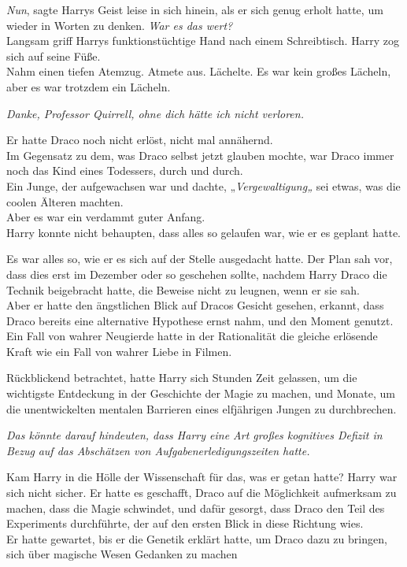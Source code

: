 {\emph{Nun}, sagte Harrys Geist leise in sich hinein, als er sich genug erholt hatte, um wieder in Worten zu denken. \emph{War es das wert?}\\ Langsam griff Harrys funktionstüchtige Hand nach einem Schreibtisch. Harry zog sich auf seine Füße.\\ Nahm einen tiefen Atemzug. Atmete aus. Lächelte. Es war kein großes Lächeln, aber es war trotzdem ein Lächeln.

\emph{Danke, Professor Quirrell, ohne dich hätte ich nicht verloren.}

Er hatte Draco noch nicht erlöst, nicht mal annähernd.\\ Im Gegensatz zu dem, was Draco selbst jetzt glauben mochte, war Draco immer noch das Kind eines Todessers, durch und durch.\\ Ein Junge, der aufgewachsen war und dachte, „\emph{Vergewaltigung„} sei etwas, was die coolen Älteren machten.\\ Aber es war ein verdammt guter Anfang.\\ Harry konnte nicht behaupten, dass alles so gelaufen war, wie er es geplant hatte.

Es war alles so, wie er es sich auf der Stelle ausgedacht hatte. Der Plan sah vor, dass dies erst im Dezember oder so geschehen sollte, nachdem Harry Draco die Technik beigebracht hatte, die Beweise nicht zu leugnen, wenn er sie sah.\\ Aber er hatte den ängstlichen Blick auf Dracos Gesicht gesehen, erkannt, dass Draco bereits eine alternative Hypothese ernst nahm, und den Moment genutzt.\\ Ein Fall von wahrer Neugierde hatte in der Rationalität die gleiche erlösende Kraft wie ein Fall von wahrer Liebe in Filmen.

Rückblickend betrachtet, hatte Harry sich Stunden Zeit gelassen, um die wichtigste Entdeckung in der Geschichte der Magie zu machen, und Monate, um die unentwickelten mentalen Barrieren eines elfjährigen Jungen zu durchbrechen.

\emph{Das könnte darauf hindeuten, dass Harry eine Art großes kognitives Defizit in Bezug} \emph{auf das Abschätzen von Aufgabenerledigungszeiten hatte.}

Kam Harry in die Hölle der Wissenschaft für das, was er getan hatte? Harry war sich nicht sicher. Er hatte es geschafft, Draco auf die Möglichkeit aufmerksam zu machen, dass die Magie schwindet, und dafür gesorgt, dass Draco den Teil des Experiments durchführte, der auf den ersten Blick in diese Richtung wies.\\ Er hatte gewartet, bis er die Genetik erklärt hatte, um Draco dazu zu bringen, sich über magische Wesen Gedanken zu machen

}
